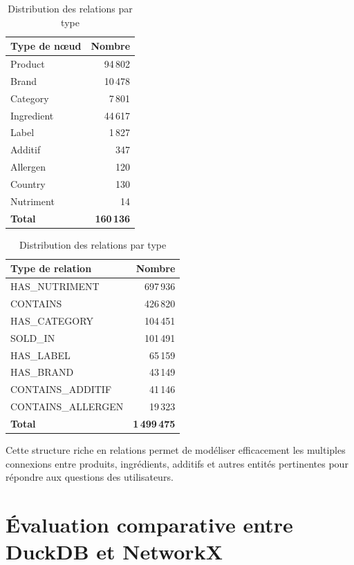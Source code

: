 \documentclass[a4paper,11pt]{article}
\begin{document}
\begin{table}[H]
\begin{minipage}[b]{0.45\linewidth}
\centering
\begin{tabular}{lr}
\toprule
\textbf{Type de nœud} & \textbf{Nombre} \\
\midrule
Product & 94\,802 \\
Brand & 10\,478 \\
Category & 7\,801 \\
Ingredient & 44\,617 \\
Label & 1\,827 \\
Additif & 347 \\
Allergen & 120 \\
Country & 130 \\
Nutriment & 14 \\
\midrule
\textbf{Total} & \textbf{160\,136} \\
\bottomrule
\end{tabular}
\caption{Distribution des nœuds par type}
\label{tab:node-types}
\end{minipage}
\hfill
\begin{minipage}[b]{0.5\linewidth}
\centering
\begin{tabular}{lr}
\toprule
\textbf{Type de relation} & \textbf{Nombre} \\
\midrule
HAS\_NUTRIMENT & 697\,936 \\
CONTAINS & 426\,820 \\
HAS\_CATEGORY & 104\,451 \\
SOLD\_IN & 101\,491 \\
HAS\_LABEL & 65\,159 \\
HAS\_BRAND & 43\,149 \\
CONTAINS\_ADDITIF & 41\,146 \\
CONTAINS\_ALLERGEN & 19\,323 \\
\midrule
\textbf{Total} & \textbf{1\,499\,475} \\
\bottomrule
\end{tabular}
\caption{Distribution des relations par type}
\label{tab:edge-types}
\end{minipage}
\end{table}

Cette structure riche en relations permet de modéliser efficacement les multiples connexions entre produits, ingrédients, additifs et autres entités pertinentes pour répondre aux questions des utilisateurs.



\section{Évaluation comparative entre DuckDB et NetworkX}
\label{sec:evaluation}
\end{document}
